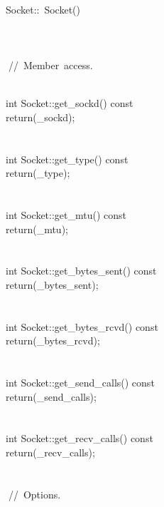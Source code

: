 \documentclass{article}
\begin{document}
\\
 Socket::~Socket() 
\\
 {
\\
 }
\\
 
\\
 
\hbox{// Member access.}\strut\\
 int Socket::get_sockd() const {
\\
         return(_sockd);
\\
 }
\\
 
\\
 int Socket::get_type() const {
\\
         return(_type);
\\
 }
\\
 
\\
 int Socket::get_mtu() const {
\\
         return(_mtu);
\\
 }
\\
 
\\
 int Socket::get_bytes_sent() const {
\\
         return(_bytes_sent);
\\
 }   
\\
 
\\
 int Socket::get_bytes_rcvd() const {
\\
         return(_bytes_rcvd);
\\
 }
\\
 
\\
 int Socket::get_send_calls() const {
\\
         return(_send_calls);
\\
 }
\\
 
\\
 int Socket::get_recv_calls() const {
\\
         return(_recv_calls);
\\
 }
\\
 
\\
 
\hbox{// Options.}\strut\\
\end{document}
